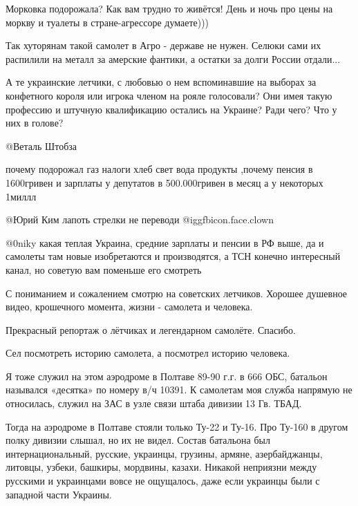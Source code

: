 \begin{itemize}
\begin{multicols}{2}
\begin{itemize}
Морковка подорожала?
Как вам трудно то живётся!
День и ночь про цены на моркву и туалеты в стране-агрессоре думаете)))


Так хуторянам  такой самолет в Агро - державе  не нужен. Селюки  сами их
распилили на металл за амерские фантики, а остатки за долги России отдали... 

А те  украинские летчики, с любовью о нем вспоминавшие  на выборах за
конфетного короля или игрока  членом на рояле голосовали?  Они имея такую
профессию и штучную квалификацию остались на Украине? Ради чего? Что у них в
голове?


@Веталь Штобза  

почему подорожал газ налоги хлеб свет вода продукты ,почему пенсия в
1600гривен и зарплаты у депутатов в 500.000гривен в месяц а у некоторых 1миллл


@Юрий Ким  лапоть стрелки не переводи  @igg{fbicon.face.clown} 


@0niky  какая теплая Украина, средние зарплаты и пенсии в РФ выше, да и
самолеты там новые изобретаются и производятся, а ТСН конечно интересный
канал, но советую вам поменьше его смотреть

\end{itemize} %


С пониманием и сожалением смотрю на советских летчиков. Хорошее душевное видео,
крошечного момента,  жизни - самолета и человека.


Прекрасный репортаж о лётчиках и легендарном самолёте. Спасибо.

Сел посмотреть историю самолета, а посмотрел историю человека.


Я тоже служил на этом аэродроме в Полтаве 89-90 г.г. в 666 ОБС,  батальон
назывался «десятка» по номеру в/ч 10391.  К самолетам моя служба напрямую не
относилась, служил на ЗАС в узле связи штаба дивизии 13 Гв. ТБАД. 

Тогда на аэродроме в Полтаве стояли только Ту-22 и Ту-16. Про Ту-160 в другом
полку дивизии слышал, но их не видел. Состав батальона был интернациональный,
русские, украинцы, грузины, армяне, азербайджанцы, литовцы, узбеки, башкиры,
мордвины, казахи. Никакой неприязни между русскими и украинцами вовсе не
ощущалось, даже если украинцы были с западной части Украины. 


\end{multicols}
\end{itemize}
